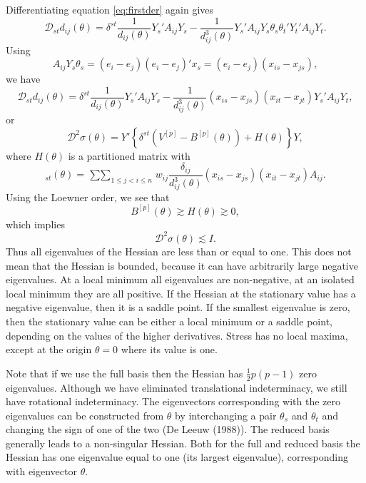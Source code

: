 \documentclass[
  12pt,
]{article}
\newcommand{\jis}{\mathop{\sum\sum}_{1\leq j<i\leq n}}
\begin{document}
Differentiating equation \eqref{eq:firstder} again gives
\begin{equation}
\mathcal{D}_{st}d_{ij}(\theta)=\delta^{st}\frac{1}{d_{ij}(\theta)}Y_s'A_{ij}Y_s-\frac{1}{d_{ij}^3(\theta)}Y_s'A_{ij}Y_s\theta_s\theta_t'Y_t'A_{ij}Y_t.
\label{eq:secondder}
\end{equation}
Using
\begin{equation}
A_{ij}Y_s\theta_s=(e_i-e_j)(e_i-e_j)'x_s=(e_i-e_j)(x_{is}-x_{js}),
\label{eq:secaux}
\end{equation}
we have
\begin{equation}
\mathcal{D}_{st}d_{ij}(\theta)=\delta^{st}\frac{1}{d_{ij}(\theta)}Y_s'A_{ij}Y_s-\frac{1}{d_{ij}^3(\theta)}(x_{is}-x_{js})(x_{it}-x_{jt})Y_s'A_{ij}Y_t,
\label{eq:secder2}
\end{equation}
or
\begin{equation}
\mathcal{D}^2\sigma(\theta)=Y'\left\{\delta^{st}(V^{[p]}-B^{[p]}(\theta))+H(\theta)\right\}Y,
\label{eq:secder3}
\end{equation}
where \(H(\theta)\) is a partitioned matrix with
\begin{equation}
[H]_{st}(\theta)=\jis w_{ij}\frac{\delta_{ij}}{d_{ij}^3(\theta)}(x_{is}-x_{js})(x_{it}-x_{jt})A_{ij}.
\label{eq:secder4}
\end{equation}
Using the Loewner order, we see that
\begin{equation}
B^{[p]}(\theta)\gtrsim H(\theta)\gtrsim 0,
\label{eq:loewner}
\end{equation}
which implies
\begin{equation}
\mathcal{D}^2\sigma(\theta)\lesssim I.
\label{eq:evald2}
\end{equation}
Thus all eigenvalues of the Hessian are less than or equal to one. This does not mean
that the Hessian is bounded, because it can have arbitrarily large negative eigenvalues.
At a local minimum all eigenvalues are non-negative, at an isolated local minimum
they are all positive. If the Hessian at the stationary value has a negative eigenvalue,
then it is a saddle point. If the smallest eigenvalue is zero, then the stationary
value can be either a local minimum or a saddle point, depending on the values of the higher
derivatives. Stress has no local maxima, except at the origin \(\theta=0\) where its value
is one.

Note that if we use the full basis then the Hessian has \(\frac12 p(p-1)\) zero
eigenvalues. Although we have eliminated translational indeterminacy, we still
have rotational indeterminacy. The eigenvectors corresponding with the
zero eigenvalues can be constructed from \(\theta\) by interchanging a pair
\(\theta_s\) and \(\theta_t\) and changing the sign of one of the two (De Leeuw (1988)). The reduced basis generally leads to a non-singular Hessian. Both for the full and reduced basis the Hessian has one eigenvalue equal to one (its largest eigenvalue), corresponding with eigenvector \(\theta\).
\end{document}
